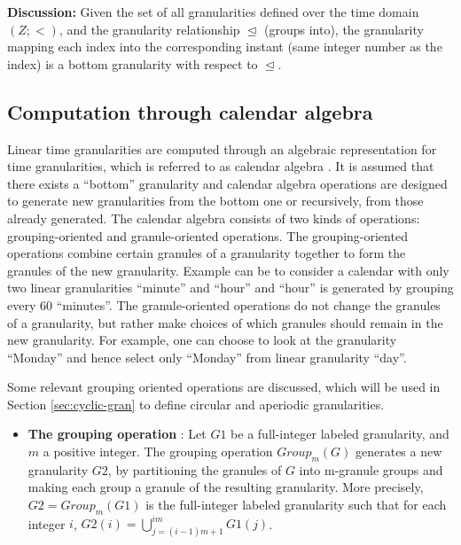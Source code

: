 \documentclass[12pt]{article}
\providecommand{\tightlist}{%
  \setlength{\itemsep}{0pt}\setlength{\parskip}{0pt}}
\begin{document}
\textbf{Discussion:} Given the set of all granularities defined over the time domain \((Z; <)\), and the granularity relationship \(\trianglelefteq\) (groups into), the granularity mapping each index into the corresponding instant (same integer number as the index) is a bottom granularity with respect to \(\trianglelefteq\).

\hypertarget{computation-through-calendar-algebra}{%
\subsection{Computation through calendar algebra}\label{computation-through-calendar-algebra}}

Linear time granularities are computed through an algebraic representation for time granularities, which is referred to as calendar algebra \citep{Ning2002-tf}. It is assumed that there exists a ``bottom'' granularity and calendar algebra operations are designed to generate
new granularities from the bottom one or recursively, from those already generated.
The calendar algebra consists of two kinds of operations: grouping-oriented and
granule-oriented operations. The grouping-oriented operations combine certain granules of a granularity together to form the granules of the new granularity. Example can be to consider a calendar with only two linear granularities ``minute'' and ``hour'' and ``hour'' is generated by grouping every \(60\) ``minutes''. The granule-oriented operations do not change the granules of a granularity, but rather make choices of which granules should remain in the new granularity. For example, one can choose to look at the granularity ``Monday'' and hence select only ``Monday'' from linear granularity ``day''.

Some relevant grouping oriented operations are discussed, which will be used in Section \ref{sec:cyclic-gran} to define circular and aperiodic granularities.

\begin{itemize}
\tightlist
\item
  \textbf{The grouping operation} : Let \(G1\) be a full-integer labeled granularity, and \(m\) a positive integer. The grouping operation \(Group_m(G)\) generates a new granularity \(G2\), by partitioning the granules of \(G\) into m-granule groups and making each group a granule of the resulting granularity.
  More precisely, \(G2 = Group_m(G1)\) is the full-integer labeled granularity such that for
  each integer \(i\), \(G2(i) = \bigcup\limits_{j = (i-1)m+1}^{im} G1(j)\).
\end{itemize}
\end{document}
